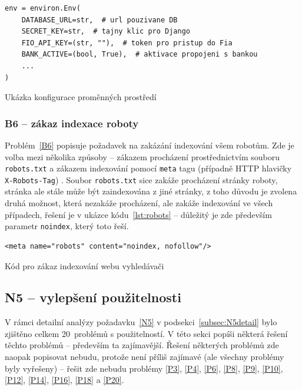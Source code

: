 \begin{listing}[ht]
	\begin{verbatim}
env = environ.Env(
    DATABASE_URL=str,  # url pouzivane DB
    SECRET_KEY=str,  # tajny klic pro Django
    FIO_API_KEY=(str, ""),  # token pro pristup do Fia
    BANK_ACTIVE=(bool, True),  # aktivace propojeni s bankou
    ...
)
	\end{verbatim}
	\caption{Ukázka konfigurace proměnných prostředí}\label{lst:envvars}
\end{listing}

\subsubsection{B6 -- zákaz indexace roboty}

Problém~\ref{B6} popisuje požadavek na zakázání indexování všem robotům. Zde je volba mezi několika způsoby -- zákazem procházení prostřednictvím souboru \verb|robots.txt| a zákazem indexování pomocí \verb|meta| tagu (případně HTTP hlavičky \verb|X-Robots-Tag|) \cite{roboti}. Soubor \verb|robots.txt| sice zakáže procházení stránky roboty, stránka ale stále může být zaindexována z jiné stránky, z toho důvodu je zvolena druhá možnost, která nezakáže procházení, ale zakáže indexování ve všech případech, řešení je v ukázce kódu~\ref{lst:robots} -- důležitý je zde především parametr \verb|noindex|, který toto řeší. 

\begin{listing}[ht]
	\begin{verbatim}
<meta name="robots" content="noindex, nofollow"/>
	\end{verbatim}
	\caption{Kód pro zákaz indexování webu vyhledávači}\label{lst:robots}
\end{listing}

\subsection{N5 -- vylepšení použitelnosti}

V rámci detailní analýzy požadavku~\ref{N5} v podsekci~\ref{subsec:N5detail} bylo zjištěno celkem 20~problémů s použitelností. V této sekci popíši některá řešení těchto problémů -- především ta zajímavější. Řešení některých problémů zde naopak popisovat nebudu, protože není příliš zajímavé (ale všechny problémy byly vyřešeny) -- řešit zde nebudu problémy \ref{P3}, \ref{P4}, \ref{P6}, \ref{P8}, \ref{P9}, \ref{P10}, \ref{P12}, \ref{P14}, \ref{P16}, \ref{P18} a \ref{P20}.
 
